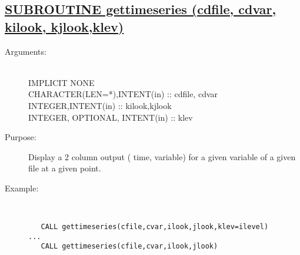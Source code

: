 \documentclass[a4paper,11pt]{article}
\begin{document}
\subsection*{\underline{SUBROUTINE gettimeseries (cdfile, cdvar, kilook, kjlook,klev) }}
\begin{description}
\item[Arguments:]\ \\
    IMPLICIT NONE \\
    CHARACTER(LEN=*),INTENT(in) :: cdfile, cdvar \\
    INTEGER,INTENT(in) :: kilook,kjlook \\
    INTEGER, OPTIONAL, INTENT(in) :: klev 
\item[Purpose:]   Display a 2 column output ( time, variable) for
               a given variable of a given file at a given point. 
\item[Example:]\ \\
\begin{verbatim}
   CALL gettimeseries(cfile,cvar,ilook,jlook,klev=ilevel)
...
   CALL gettimeseries(cfile,cvar,ilook,jlook)
\end{verbatim}
\end{description}
\newpage
\end{document}
